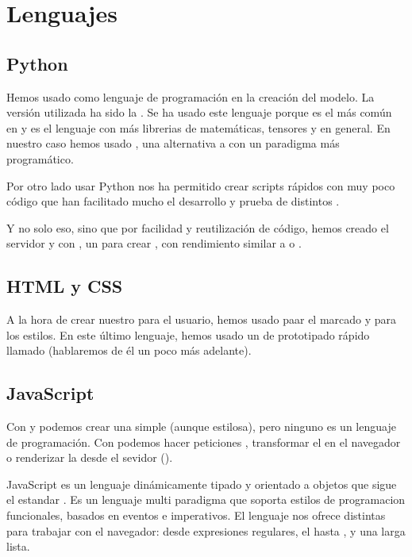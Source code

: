 
\section{Lenguajes}

\subsection{Python}

Hemos usado  como lenguaje de programación en la creación del modelo. La versión utilizada ha sido la . Se ha usado este lenguaje porque es el más común en  y es el lenguaje con más librerias de matemáticas, tensores y  en general. En nuestro caso hemos usado , una alternativa a  con un paradigma más programático.

Por otro lado usar Python nos ha permitido crear scripts rápidos con muy poco código que han facilitado mucho el desarrollo y prueba de distintos .

Y no solo eso, sino que por facilidad y reutilización de código, hemos creado el servidor y  con , un  para crear , con rendimiento similar a  o .

\subsection{HTML y CSS}

A la hora de crear nuestro  para el usuario, hemos usado  paar el marcado y  para los estilos. En este último lenguaje, hemos usado un  de prototipado rápido llamado  (hablaremos de él un poco más adelante).

\subsection{JavaScript}

Con  y  podemos crear una  simple (aunque estilosa), pero ninguno es un lenguaje de programación. Con  podemos hacer peticiones , transformar el  en el navegador o renderizar la  desde el sevidor ().

JavaScript es un lenguaje dinámicamente tipado y orientado a objetos que sigue el estandar . Es un lenguaje multi paradigma que soporta estilos de programacion funcionales, basados en eventos e imperativos. El lenguaje nos ofrece distintas  para trabajar con el navegador: desde expresiones regulares, el  hasta , y una larga lista.

